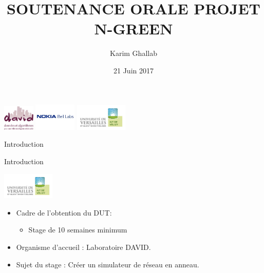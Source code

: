 \documentclass[10 pt]{beamer}
\title{SOUTENANCE ORALE PROJET N-GREEN}
\author{Karim Ghallab}
\institute[DAVID-UVSQ, IUT V\'elizy] 
{
  DAVID, Universit\'e de Versailles Saint Quentin -
  IUT V\'elizy 
}
\date{21 Juin 2017}
\begin{document}
\begin{frame}

  \titlepage
  \centering
  \includegraphics [width=15mm]{logod.png} \hspace{1,5cm} \includegraphics [width=20mm]{logon.png} \hspace{1cm} \includegraphics [width=25mm]{logos/logo_iut.jpg} \\
\end{frame}

\begin{frame}
\begin{center}
  \tableofcontents[]
  \end{center}
\end{frame}

\begin{section}{Introduction}
\begin{frame}{Introduction}

\hspace{8cm} \includegraphics [width=25mm]{logos/logo_iut.jpg}
\begin{itemize}
\item Cadre de l'obtention du DUT:
\begin{itemize}
\item Stage de 10 semaines minimum
\end{itemize}
\vspace{0,5cm}
\item Organisme d'accueil : Laboratoire DAVID.
\vspace{1cm}
\item Sujet du stage : Cr\'eer un simulateur de r\'eseau en anneau.
\end{itemize}

\end{frame}
\end{section}
\end{document}
